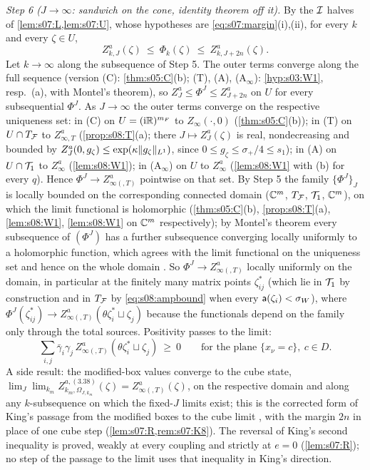\emph{Step 6 ($J\to\infty$: sandwich on the cone, identity theorem off it).} By the $\mathcal I$ halves of \cref{lem:s07:L,lem:s07:U}, whose hypotheses are \eqref{eq:s07:margin}(i),(ii), for every $k$ and every $\zeta\in U$,
\begin{equation}\label{eq:s08:sandwich}
Z^a_{k,J}(\zeta)\ \le\ \Phi_k(\zeta)\ \le\ Z^a_{k,J+2n}(\zeta).
\end{equation}
Let $k\to\infty$ along the subsequence of Step 5. The outer terms converge along the full sequence (version (C): \cref{thm:s05:C}(b); (T), (A), (A$_\infty$): \cref{hyp:s03:W1}, resp.\ \Wtwo(a), with Montel's theorem), so $Z^a_J\le\Phi^J\le Z^a_{J+2n}$ on $U$ for every subsequential $\Phi^J$. As $J\to\infty$ the outer terms converge on the respective uniqueness set: in (C) on $U=(\mathrm i\mathbb R)^{m_F}$ to $Z_\infty(\cdot,0)$ (\cref{thm:s05:C}(b)); in (T) on $U\cap T_{\mathcal F}$ to $Z^a_{\infty,T}$ (\cref{prop:s08:T}(a); there $J\mapsto Z^a_J(\zeta)$ is real, nondecreasing and bounded by $Z^a_J(0,g_\zeta)\le\exp(\kappa\lVert g_\zeta\rVert_{L^1})$, since $0\le g_\zeta\le\sigma_+/4\le s_1$); in (A) on $U\cap\mathcal T_1$ to $Z^a_\infty$ (\cref{lem:s08:W1}); in (A$_\infty$) on $U$ to $Z^a_\infty$ (\cref{lem:s08:W1} with \Wtwo(b) for every $q$). Hence $\Phi^J\to Z^a_{\infty(,T)}$ pointwise on that set. By Step 5 the family $\{\Phi^J\}_J$ is locally bounded on the corresponding connected domain ($\mathbb C^{m}$, $T_{\mathcal F}$, $\mathcal T_1$, $\mathbb C^m$), on which the limit functional is holomorphic (\cref{thm:s05:C}(b), \cref{prop:s08:T}(a), \cref{lem:s08:W1}, \cref{lem:s08:W1} on $\mathbb C^m$ respectively); by Montel's theorem every subsequence of $(\Phi^J)$ has a further subsequence converging locally uniformly to a holomorphic function, which agrees with the limit functional on the uniqueness set and hence on the whole domain \cite{Hor90}. So $\Phi^J\to Z^a_{\infty(,T)}$ locally uniformly on the domain, in particular at the finitely many matrix points $\zeta^*_{ij}$ (which lie in $\mathcal T_1$ by construction and in $T_{\mathcal F}$ by \eqref{eq:s08:ampbound} when every $\mathsf a(\zeta_i)<\sigma_W$), where $\Phi^J(\zeta^*_{ij})\to Z^a_{\infty(,T)}(\theta\zeta_i^*\sqcup\zeta_j)$ because the functionals depend on the family only through the total sources. Positivity passes to the limit:
\begin{equation}\label{eq:s08:midplane}
\sum_{i,j}\bar\gamma_i\gamma_j\,Z^a_{\infty(,T)}(\theta\zeta_i^*\sqcup\zeta_j)\ \ge\ 0\qquad\text{for the plane }\{x_\nu=c\},\ c\in D .
\end{equation}
A side result: the modified-box values converge to the cube state, $\lim_J\lim_{k_m}Z^{a,(3.38)}_{k_m,\Omega_{J,k_m}}(\zeta)=Z^a_{\infty(,T)}(\zeta)$, on the respective domain and along any $k$-subsequence on which the fixed-$J$ limits exist; this is the corrected form of King's passage from the modified boxes to the cube limit \cite[(3.42)]{K2}, with the margin $2n$ in place of one cube step (\cref{lem:s07:R,rem:s07:K8}). The reversal of King's second inequality is proved, weakly at every coupling and strictly at $e=0$ (\cref{lem:s07:R}); no step of the passage to the limit uses that inequality in King's direction.

